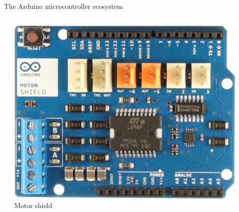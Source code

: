 \documentclass[compress]{beamer}
\begin{document}
\begin{frame}{The Arduino microcontroller ecosystem}
\begin{columns}
\begin{column}{0.3\linewidth}
        \end{column}
        \begin{column}{0.3\linewidth}
            \begin{center}
            \includegraphics[width=\linewidth]{motor-shield}
            Motor shield
            \end{center}

        \end{column}
    \end{columns}

    \vspace{0.5em}


\end{frame}
\end{document}
